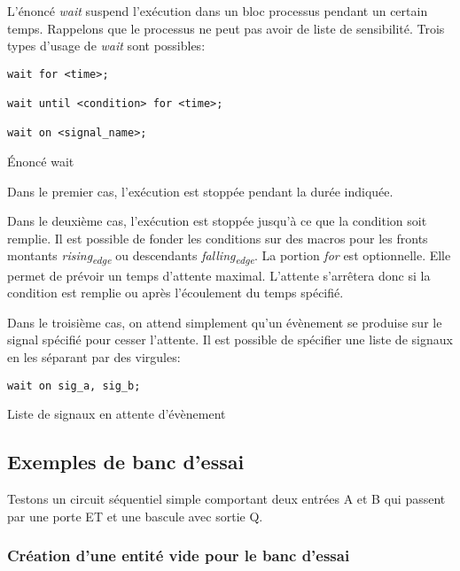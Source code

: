\documentclass[11pt]{article}
\begin{document}
\begin{enumerate}
L'énoncé \emph{wait} suspend l'exécution dans un bloc processus pendant un
certain temps. Rappelons que le processus ne peut pas avoir de liste
de sensibilité. Trois types d'usage de \emph{wait} sont possibles:

\begin{listing}[htbp]
\begin{verbatim}
wait for <time>; 

wait until <condition> for <time>;

wait on <signal_name>;
\end{verbatim}
\caption{Énoncé wait}
\end{listing}

Dans le premier cas, l'exécution est stoppée pendant la durée
indiquée.

Dans le deuxième cas, l'exécution est stoppée jusqu'à ce que la
condition soit remplie. Il est possible de fonder les conditions sur
des macros pour les fronts montants \emph{rising\textsubscript{edge}} ou descendants
\emph{falling\textsubscript{edge}}. La portion \emph{for} est optionnelle. Elle permet de
prévoir un temps d'attente maximal. L'attente s'arrêtera donc si la
condition est remplie ou après l'écoulement du temps spécifié.

Dans le troisième cas, on attend simplement qu'un évènement se
produise sur le signal spécifié pour cesser l'attente. Il est possible
de spécifier une liste de signaux en les séparant par des virgules:

\begin{listing}[htbp]
\begin{verbatim}
wait on sig_a, sig_b;
\end{verbatim}
\caption{Liste de signaux en attente d'évènement}
\end{listing}
\end{enumerate}


\subsection{Exemples de banc d'essai}
\label{sec:org3d209a8}

Testons un circuit séquentiel simple comportant deux entrées A et
B qui passent par une porte ET et une bascule avec sortie Q.

\subsubsection{Création d'une entité vide pour le banc d'essai}
\label{sec:orgcc51b47}
\end{document}
